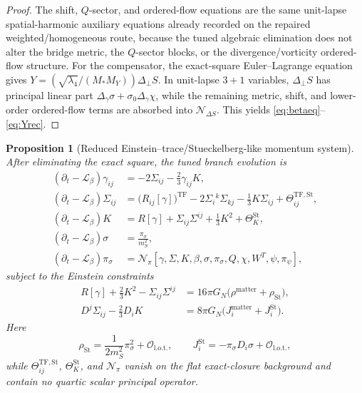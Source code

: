 \documentclass[11pt]{article}
\newcommand{\Ell}{\mathcal{L}}
\newtheorem{proposition}{Proposition}
\begin{document}
\begin{proof}
The shift, \(Q\)-sector, and ordered-flow equations are the same unit-lapse spatial-harmonic auxiliary equations already recorded on the repaired weighted/homogeneous route, because the tuned algebraic elimination does not alter the bridge metric, the \(Q\)-sector blocks, or the divergence/vorticity ordered-flow structure. For the compensator, the exact-square Euler--Lagrange equation gives \(Y=(\sqrt{\lambda_4}/(M_*M_Y))\Delta_\perp S\). In unit-lapse \(3+1\) variables, \(\Delta_\perp S\) has principal linear part \(\Delta_\gamma\sigma+\sigma_0\Delta_\gamma\chi\), while the remaining metric, shift, and lower-order ordered-flow terms are absorbed into \(\mathcal N_{\Delta S}\). This yields \eqref{eq:betaeq}--\eqref{eq:Yrec}.
\end{proof}

\begin{proposition}[Reduced Einstein--trace/Stueckelberg-like momentum system]
\label{prop:reducedsystem}
After eliminating the exact square, the tuned branch evolution is
\begin{align}
(\partial_t-\Ell_\beta)\gamma_{ij}
&=
-2\Sigma_{ij}-\frac23\gamma_{ij}K,
\label{eq:gammadt}
\\
(\partial_t-\Ell_\beta)\Sigma_{ij}
&=
\bigl(R_{ij}[\gamma]\bigr)^{\mathrm{TF}}
-2\Sigma_i{}^k\Sigma_{kj}
-\frac13 K\Sigma_{ij}
+\Theta_{ij}^{\mathrm{TF,St}},
\label{eq:Sigmadt}
\\
(\partial_t-\Ell_\beta)K
&=
R[\gamma]+\Sigma_{ij}\Sigma^{ij}+\frac13K^2+\Theta_K^{\mathrm{St}},
\label{eq:Kdt}
\\
(\partial_t-\Ell_\beta)\sigma
&=
\frac{\pi_\sigma}{m_S^2},
\label{eq:sigmadt}
\\
(\partial_t-\Ell_\beta)\pi_\sigma
&=
\mathcal N_\pi[\gamma,\Sigma,K,\beta,\sigma,\pi_\sigma,Q,\chi,W^T,\psi,\pi_\psi],
\label{eq:pidt}
\end{align}
subject to the Einstein constraints
\begin{align}
R[\gamma]+\frac23K^2-\Sigma_{ij}\Sigma^{ij}
&=
16\pi G_N\bigl(\rho^{\mathrm{matter}}+\rho_{\mathrm{St}}\bigr),
\label{eq:Hconstraint}
\\
D^j\Sigma_{ij}-\frac23D_iK
&=
8\pi G_N\bigl(J_i^{\mathrm{matter}}+J_i^{\mathrm{St}}\bigr).
\label{eq:Mconstraint}
\end{align}
Here
\begin{equation}
\rho_{\mathrm{St}}
=
\frac{1}{2m_S^2}\pi_\sigma^2+\mathcal O_{\mathrm{l.o.t.}},
\qquad
J_i^{\mathrm{St}}
=
-\pi_\sigma D_i\sigma+\mathcal O_{\mathrm{l.o.t.}},
\label{eq:ststress}
\end{equation}
while \(\Theta_{ij}^{\mathrm{TF,St}}\), \(\Theta_K^{\mathrm{St}}\), and \(\mathcal N_\pi\) vanish on the flat exact-closure background and contain no quartic scalar principal operator.
\end{proposition}
\end{document}
